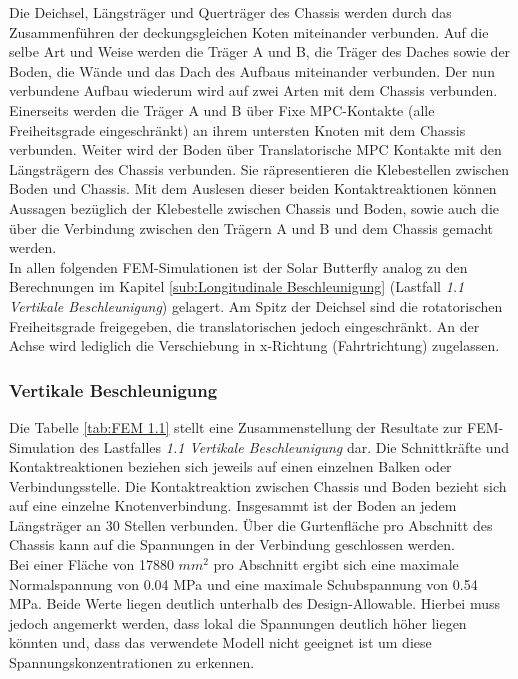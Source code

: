 Die Deichsel, Längsträger und Querträger des Chassis werden durch das Zusammenführen der deckungsgleichen Koten miteinander verbunden. Auf die selbe Art und Weise werden die Träger A und B, die Träger des Daches sowie der Boden, die Wände und das Dach des Aufbaus miteinander verbunden. Der nun verbundene Aufbau wiederum wird auf zwei Arten mit dem Chassis verbunden. Einerseits werden die Träger A und B über Fixe MPC-Kontakte (alle Freiheitsgrade eingeschränkt) an ihrem untersten Knoten mit dem Chassis verbunden. Weiter wird der Boden über Translatorische MPC Kontakte mit den Längsträgern des Chassis verbunden. Sie räpresentieren die Klebestellen zwischen Boden und Chassis. Mit dem Auslesen dieser beiden Kontaktreaktionen können Aussagen bezüglich der Klebestelle zwischen Chassis und Boden, sowie auch die über die Verbindung zwischen den Trägern A und B und dem Chassis gemacht werden.\\
In allen folgenden FEM-Simulationen ist der Solar Butterfly analog zu den Berechnungen im Kapitel \ref{sub:Longitudinale Beschleunigung} (Lastfall \emph{1.1 Vertikale Beschleunigung}) gelagert. Am Spitz der Deichsel sind die rotatorischen Freiheitsgrade freigegeben, die translatorischen jedoch eingeschränkt. An der Achse wird lediglich die Verschiebung in x-Richtung (Fahrtrichtung) zugelassen.


\subsubsection{Vertikale Beschleunigung}
Die Tabelle \ref{tab:FEM 1.1} stellt eine Zusammenstellung der Resultate zur FEM-Simulation des Lastfalles \emph{1.1 Vertikale Beschleunigung} dar. Die Schnittkräfte und Kontaktreaktionen beziehen sich jeweils auf einen einzelnen Balken oder Verbindungsstelle. Die Kontaktreaktion zwischen Chassis und Boden bezieht sich auf eine einzelne Knotenverbindung. Insgesammt ist der Boden an jedem Längsträger an 30 Stellen verbunden. Über die Gurtenfläche pro Abschnitt des Chassis kann auf die Spannungen in der Verbindung geschlossen werden.\\
Bei einer Fläche von 17880 $mm^2$ pro Abschnitt ergibt sich eine maximale Normalspannung von 0.04 MPa und eine maximale Schubspannung von 0.54 MPa. Beide Werte liegen deutlich unterhalb des Design-Allowable. Hierbei muss jedoch angemerkt werden, dass lokal die Spannungen deutlich höher liegen könnten und, dass das verwendete Modell nicht geeignet ist um diese Spannungskonzentrationen zu erkennen.


